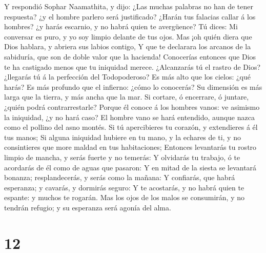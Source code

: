  Y respondió Sophar Naamathita, y dijo: 
¿Las muchas palabras no han de tener respuesta? ¿y el hombre parlero
será justificado?  ¿Harán tus falacias callar á los
hombres? ¿y harás escarnio, y no habrá quien te avergüence?
 Tú dices: Mi conversar es puro, y yo soy limpio delante
de tus ojos.  Mas ¡oh quién diera que Dios hablara, y
abriera sus labios contigo,  Y que te declarara los
arcanos de la sabiduría, que son de doble valor que la hacienda!
Conocerías entonces que Dios te ha castigado menos que tu iniquidad
merece.  ¿Alcanzarás tú el rastro de Dios? ¿llegarás tú á
la perfección del Todopoderoso?  Es más alto que los
cielos: ¿qué harás? Es más profundo que el infierno: ¿cómo lo conocerás?
 Su dimensión es más larga que la tierra, y más ancha que
la mar.  Si cortare, ó encerrare, ó juntare, ¿quién podrá
contrarrestarle?  Porque él conoce á los hombres vanos:
ve asimismo la iniquidad, ¿y no hará caso?  El hombre
vano se hará entendido, aunque nazca como el pollino del asno montés.
 Si tú apercibieres tu corazón, y extendieres á él tus
manos;  Si alguna iniquidad hubiere en tu mano, y la
echares de ti, y no consintieres que more maldad en tus habitaciones;
 Entonces levantarás tu rostro limpio de mancha, y serás
fuerte y no temerás:  Y olvidarás tu trabajo, ó te
acordarás de él como de aguas que pasaron:  Y en mitad de
la siesta se levantará bonanza; resplandecerás, y serás como la mañana:
 Y confiarás, que habrá esperanza; y cavarás, y dormirás
seguro:  Y te acostarás, y no habrá quien te espante: y
muchos te rogarán.  Mas los ojos de los malos se
consumirán, y no tendrán refugio; y su esperanza será agonía del alma.

\hypertarget{section-11}{%
\section{12}\label{section-11}}

